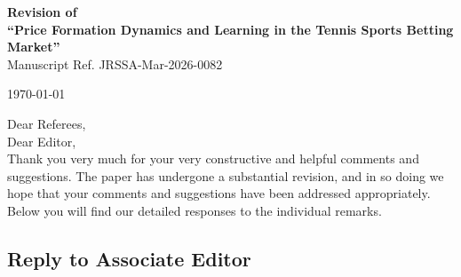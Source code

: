 \documentclass[letterpaper,12pt]{article}
\newcounter{b}
\begin{document}
\itemsep6pt

\onehalfspacing

\begin{center}
\textbf{\Large Revision of \\[6pt]
``Price Formation Dynamics and Learning in the Tennis
Sports Betting Market''}\\[6pt]
Manuscript Ref. JRSSA-Mar-2026-0082\\[24pt]
\end{center}


\begin{flushright}
   \today
\end{flushright}

Dear Referees,\\
Dear Editor,\\

Thank you very much for your very constructive and helpful comments and suggestions. The paper has undergone a substantial revision, and in so doing we hope that your comments and suggestions have been addressed appropriately. Below you will find our detailed responses to the individual remarks. 




\newpage


\subsection*{Reply to Associate Editor}
\end{document}
